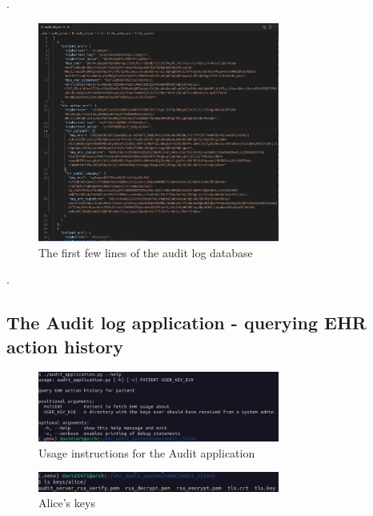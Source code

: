 \documentclass[11pt]{article}
\begin{document}
\begin{flushleft}
.

\begin{figure}[h!]
\begin{center}
	\includegraphics[width = 300px]{images/audit_db_enc.png}
	\caption{The first few lines of the audit log database}
\end{center}
\end{figure}

.

\subsection{The Audit log application - querying EHR action history}

\begin{figure}[h!]
	\begin{center}
		\includegraphics[width = 300px]{images/audit_application_help.png}
		\caption{Usage instructions for the Audit application}
	\end{center}
\end{figure}

\begin{figure}[h!]
\begin{center}
	\includegraphics[width = 300px]{images/alice_keys.png}
	\caption{Alice's keys}
\end{center}
\end{figure}


\end{flushleft}
\end{document}
